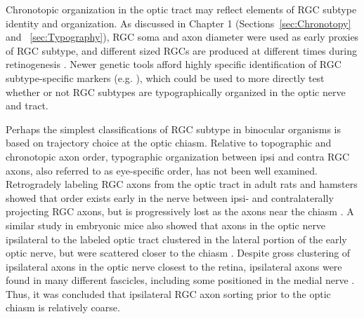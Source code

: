 Chronotopic organization in the optic tract may reflect elements of RGC subtype identity and organization.
As discussed in Chapter 1 (Sections~\ref{sec:Chronotopy} and ~\ref{sec:Typography}), RGC soma and axon diameter were used as early proxies of RGC subtype, and different sized RGCs are produced at different times during retinogenesis \cite{reese1994birthdates,rapaport1995spatiotemporal}.
Newer genetic tools afford highly specific identification of RGC subtype-specific markers (e.g. ), which could be used to more directly test whether or not RGC subtypes are typographically organized in the optic nerve and tract.

Perhaps the simplest classifications of RGC subtype in binocular organisms is based on trajectory choice at the optic chiasm.
Relative to topographic and chronotopic axon order, typographic organization between ipsi and contra RGC axons, also referred to as eye-specific order, has not been well examined.
Retrogradely labeling RGC axons from the optic tract in adult rats and hamsters showed that order exists early in the nerve between ipsi- and contralaterally projecting RGC axons, but is progressively lost as the axons near the chiasm \cite{baker1989distribution}.
A similar study in embryonic mice also showed that axons in the optic nerve ipsilateral to the labeled optic tract clustered in the lateral portion of the early optic nerve, but were scattered closer to the chiasm \cite{colello1990early}.
Despite gross clustering of ipsilateral axons in the optic nerve closest to the retina, ipsilateral axons were found in many different fascicles, including some positioned in the medial nerve \cite{colello1990early}.
Thus, it was concluded that ipsilateral RGC axon sorting prior to the optic chiasm is relatively coarse.

